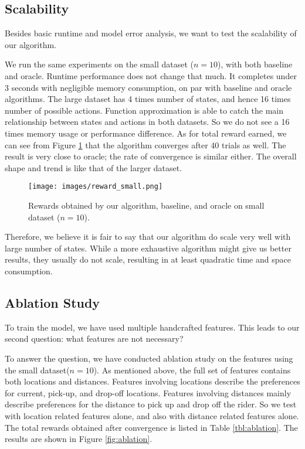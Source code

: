 \documentclass{article}
\begin{document}
\subsection{Scalability}

Besides basic runtime and model error analysis, we want to test the scalability of our algorithm.

We run the same experiments on the small dataset ($n=10$), with both baseline and oracle. Runtime performance does not change that much. It completes under 3 seconds with negligible memory consumption, on par with baseline and oracle algorithms. The large dataset has 4 times number of states, and hence 16 times number of possible actions. Function approximation is able to catch the main relationship between states and actions in both datasets. So we do not see a 16 times memory usage or performance difference. As for total reward earned, we can see from Figure \ref{fig:reward_small} that the algorithm converges after 40 trials as well. The result is very close to oracle; the rate of convergence is similar either. The overall shape and trend is like that of the larger dataset.

\begin{figure}[!htb]
\begin{center}
\texttt{[image: images/reward\_small.png]}
\end{center}
\caption{Rewards obtained by our algorithm, baseline, and oracle on small dataset ($n=10$).}
\label{fig:reward_small}
\end{figure}

Therefore, we believe it is fair to say that our algorithm do scale very well with large number of states. While a more exhaustive algorithm might give us better results, they usually do not scale, resulting in at least quadratic time and space consumption.

\subsection{Ablation Study}

To train the model, we have used multiple handcrafted features. This leads to our second question: what features are not necessary?

To answer the question, we have conducted ablation study on the features using the small dataset($n=10$). As mentioned above, the full set of features contains both locations and distances. Features involving locations describe the preferences for current, pick-up, and drop-off locations. Features involving distances mainly describe preferences for the distance to pick up and drop off the rider. So we test with location related features alone, and also with distance related features alone. The total rewards obtained after convergence is listed in Table \ref{tbl:ablation}. The results are shown in Figure \ref{fig:ablation}.
\end{document}
